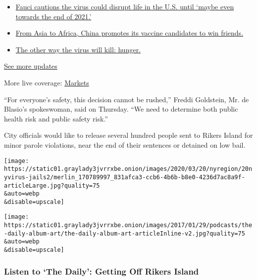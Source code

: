\begin{itemize}
\tightlist
\item
  \href{https://www.nytimes3xbfgragh.onion/2020/09/11/world/covid-19-coronavirus.html?action=click\&pgtype=Article\&state=default\&region=MAIN_CONTENT_1\&context=storylines_live_updates\#link-dfb8a16}{Fauci
  cautions the virus could disrupt life in the U.S. until `maybe even
  towards the end of 2021.'}
\item
  \href{https://www.nytimes3xbfgragh.onion/2020/09/11/world/covid-19-coronavirus.html?action=click\&pgtype=Article\&state=default\&region=MAIN_CONTENT_1\&context=storylines_live_updates\#link-7104d154}{From
  Asia to Africa, China promotes its vaccine candidates to win friends.}
\item
  \href{https://www.nytimes3xbfgragh.onion/2020/09/11/world/covid-19-coronavirus.html?action=click\&pgtype=Article\&state=default\&region=MAIN_CONTENT_1\&context=storylines_live_updates\#link-393ad215}{The
  other way the virus will kill: hunger.}
\end{itemize}

\href{https://www.nytimes3xbfgragh.onion/2020/09/11/world/covid-19-coronavirus.html?action=click\&pgtype=Article\&state=default\&region=MAIN_CONTENT_1\&context=storylines_live_updates}{See
more updates}

More live coverage:
\href{https://www.nytimes3xbfgragh.onion/live/2020/09/11/business/stock-market-today-coronavirus?action=click\&pgtype=Article\&state=default\&region=MAIN_CONTENT_1\&context=storylines_live_updates}{Markets}

``For everyone's safety, this decision cannot be rushed,'' Freddi
Goldstein, Mr. de Blasio's spokeswoman, said on Thursday. ``We need to
determine both public health risk and public safety risk.''

City officials would like to release several hundred people sent to
Rikers Island for minor parole violations, near the end of their
sentences or detained on low bail.

\texttt{[image: https://static01.graylady3jvrrxbe.onion/images/2020/03/20/nyregion/20nyvirus-jails2/merlin\_170789997\_831afca3-ccb6-4b6b-b8e0-4236d7ac8a9f-articleLarge.jpg?quality=75\\\&auto=webp\\\&disable=upscale]}

\texttt{[image: https://static01.graylady3jvrrxbe.onion/images/2017/01/29/podcasts/the-daily-album-art/the-daily-album-art-articleInline-v2.jpg?quality=75\\\&auto=webp\\\&disable=upscale]}

\hypertarget{listen-to-the-daily-getting-off-rikers-island}{%
\subsubsection{Listen to `The Daily': Getting Off Rikers
Island}\label{listen-to-the-daily-getting-off-rikers-island}}

